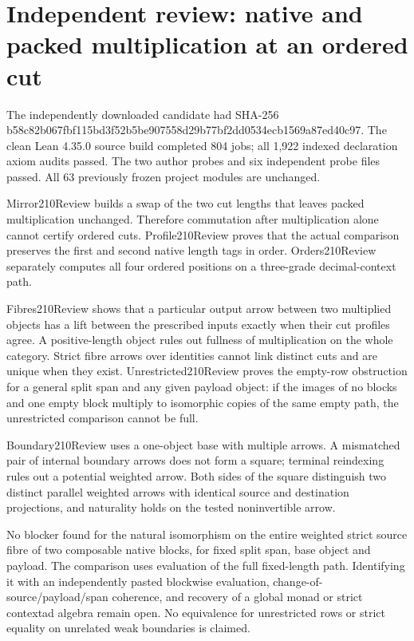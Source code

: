 \documentclass{article}
\begin{document}
\section*{Independent review: native and packed multiplication at an ordered cut}
The independently downloaded candidate had SHA-256 b58c82b067fbf115bd3f52b5be907558d29b77bf2dd0534ecb1569a87ed40c97. The clean Lean 4.35.0 source build completed 804 jobs; all 1,922 indexed declaration axiom audits passed. The two author probes and six independent probe files passed. All 63 previously frozen project modules are unchanged.
\par Mirror210Review builds a swap of the two cut lengths that leaves packed multiplication unchanged. Therefore commutation after multiplication alone cannot certify ordered cuts. Profile210Review proves that the actual comparison preserves the first and second native length tags in order. Orders210Review separately computes all four ordered positions on a three-grade decimal-context path.
\par Fibres210Review shows that a particular output arrow between two multiplied objects has a lift between the prescribed inputs exactly when their cut profiles agree. A positive-length object rules out fullness of multiplication on the whole category. Strict fibre arrows over identities cannot link distinct cuts and are unique when they exist. Unrestricted210Review proves the empty-row obstruction for a general split span and any given payload object: if the images of no blocks and one empty block multiply to isomorphic copies of the same empty path, the unrestricted comparison cannot be full.
\par Boundary210Review uses a one-object base with multiple arrows. A mismatched pair of internal boundary arrows does not form a square; terminal reindexing rules out a potential weighted arrow. Both sides of the square distinguish two distinct parallel weighted arrows with identical source and destination projections, and naturality holds on the tested noninvertible arrow.
\par No blocker found for the natural isomorphism on the entire weighted strict source fibre of two composable native blocks, for fixed split span, base object and payload. The comparison uses evaluation of the full fixed-length path. Identifying it with an independently pasted blockwise evaluation, change-of-source/payload/span coherence, and recovery of a global monad or strict contextad algebra remain open. No equivalence for unrestricted rows or strict equality on unrelated weak boundaries is claimed.
\end{document}
